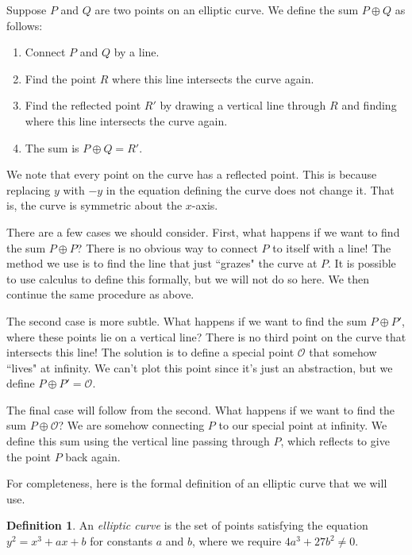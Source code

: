\documentclass{book}
\theoremstyle{plain}
\theoremstyle{definition}
\newtheorem{definition}[theorem]{Definition}
\begin{document}
Suppose $P$ and $Q$ are two points on an elliptic curve. We define the sum $P \oplus Q$ as follows:
\begin{enumerate}
\item Connect $P$ and $Q$ by a line.
\item Find the point $R$ where this line intersects the curve again.
\item Find the reflected point $R'$ by drawing a vertical line through $R$ and finding where this line intersects the curve again.
\item The sum is $P \oplus Q = R'$.
\end{enumerate}

We note that every point on the curve has a reflected point. This is because replacing $y$ with $-y$ in the equation defining the curve does not change it. That is, the curve is symmetric about the $x$-axis.

There are a few cases we should consider. First, what happens if we want to find the sum $P \oplus P$? There is no obvious way to connect $P$ to itself with a line! The method we use is to find the line that just ``grazes" the curve at $P$. It is possible to use calculus to define this formally, but we will not do so here. We then continue the same procedure as above.

The second case is more subtle. What happens if we want to find the sum $P \oplus P'$, where these points lie on a vertical line? There is no third point on the curve that intersects this line! The solution is to define a special point $\mathcal{O}$ that somehow ``lives" at infinity. We can't plot this point since it's just an abstraction, but we define $P \oplus P' = \mathcal{O}$.

The final case will follow from the second. What happens if we want to find the sum $P \oplus \mathcal{O}$? We are somehow connecting $P$ to our special point at infinity. We define this sum using the vertical line passing through $P$, which reflects to give the point $P$ back again.

For completeness, here is the formal definition of an elliptic curve that we will use.

\begin{definition}
An {\it elliptic curve} is the set of points satisfying the equation $y^2 = x^3 + ax + b$ for constants $a$ and $b$, where we require $4a^3 + 27b^2 \neq 0$.
\end{definition}
\end{document}

